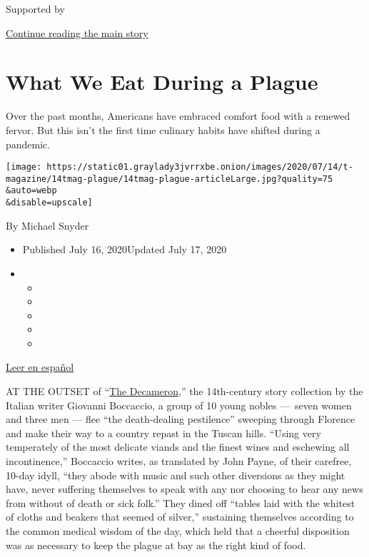 Supported by

\protect\hyperlink{after-sponsor}{Continue reading the main story}

\hypertarget{what-we-eat-during-a-plague}{%
\section{What We Eat During a
Plague}\label{what-we-eat-during-a-plague}}

Over the past months, Americans have embraced comfort food with a
renewed fervor. But this isn't the first time culinary habits have
shifted during a pandemic.

\texttt{[image: https://static01.graylady3jvrrxbe.onion/images/2020/07/14/t-magazine/14tmag-plague/14tmag-plague-articleLarge.jpg?quality=75\\\&auto=webp\\\&disable=upscale]}

By Michael Snyder

\begin{itemize}
\item
  Published July 16, 2020Updated July 17, 2020
\item
  \begin{itemize}
  \item
  \item
  \item
  \item
  \item
  \end{itemize}
\end{itemize}

\href{https://www.nytimes3xbfgragh.onion/es/2020/07/23/t-magazine/comida-pandemia.html}{Leer
en español}

AT THE OUTSET of
``\href{https://www.nytimes3xbfgragh.onion/interactive/2020/07/07/magazine/decameron-project-short-story-collection.html}{The
Decameron},'' the 14th-century story collection by the Italian writer
Giovanni Boccaccio, a group of 10 young nobles ---~seven women and three
men --- flee ``the death-dealing pestilence'' sweeping through Florence
and make their way to a country repast in the Tuscan hills. ``Using very
temperately of the most delicate viands and the finest wines and
eschewing all incontinence,'' Boccaccio writes, as translated by John
Payne, of their carefree, 10-day idyll, ``they abode with music and such
other diversions as they might have, never suffering themselves to speak
with any nor choosing to hear any news from without of death or sick
folk.'' They dined off ``tables laid with the whitest of cloths and
beakers that seemed of silver,'' sustaining themselves according to the
common medical wisdom of the day, which held that a cheerful disposition
was as necessary to keep the plague at bay as the right kind of food.

